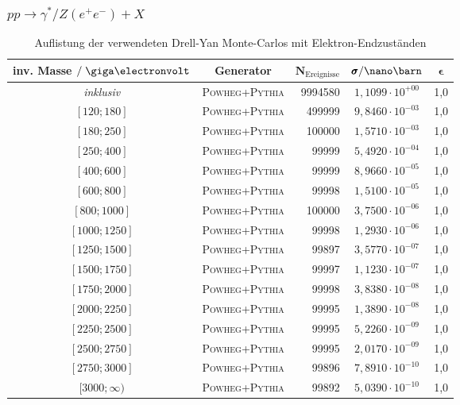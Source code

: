 \subsubsection*{$pp \rightarrow \gamma^*/Z(e^+e^-) + X$}
\begin{table}[h]
    \footnotesize
    \centering
    \begin{tabular}{|c|c|r|c|c|}
        \hline
        \bf{inv. Masse} $/\GeV$ & \bf{Generator} & $\pmb N_\text{Ereignisse}$ &
        $\pmb\sigma / \nano\barn$ & $\pmb\epsilon$ \\
        \hline \hline
        \textit{inklusiv} & \textsc{Powheg+Pythia} & 9994580 & $1,1099\cdot 10^{+00}$ & 1,0 \\
        $[120 ; 180]$     & \textsc{Powheg+Pythia} & 499999  & $9,8460\cdot 10^{-03}$ & 1,0 \\
        $[180 ; 250]$     & \textsc{Powheg+Pythia} & 100000  & $1,5710\cdot 10^{-03}$ & 1,0 \\
        $[250 ; 400]$     & \textsc{Powheg+Pythia} & 99999   & $5,4920\cdot 10^{-04}$ & 1,0 \\
        $[400 ; 600]$     & \textsc{Powheg+Pythia} & 99999   & $8,9660\cdot 10^{-05}$ & 1,0 \\
        $[600 ; 800]$     & \textsc{Powheg+Pythia} & 99998   & $1,5100\cdot 10^{-05}$ & 1,0 \\
        $[800 ; 1000]$    & \textsc{Powheg+Pythia} & 100000  & $3,7500\cdot 10^{-06}$ & 1,0 \\
        $[1000 ; 1250]$   & \textsc{Powheg+Pythia} & 99998   & $1,2930\cdot 10^{-06}$ & 1,0 \\
        $[1250 ; 1500]$   & \textsc{Powheg+Pythia} & 99897   & $3,5770\cdot 10^{-07}$ & 1,0 \\
        $[1500 ; 1750]$   & \textsc{Powheg+Pythia} & 99997   & $1,1230\cdot 10^{-07}$ & 1,0 \\
        $[1750 ; 2000]$   & \textsc{Powheg+Pythia} & 99998   & $3,8380\cdot 10^{-08}$ & 1,0 \\
        $[2000 ; 2250]$   & \textsc{Powheg+Pythia} & 99995   & $1,3890\cdot 10^{-08}$ & 1,0 \\
        $[2250 ; 2500]$   & \textsc{Powheg+Pythia} & 99995   & $5,2260\cdot 10^{-09}$ & 1,0 \\
        $[2500 ; 2750]$   & \textsc{Powheg+Pythia} & 99995   & $2,0170\cdot 10^{-09}$ & 1,0 \\
        $[2750 ; 3000]$   & \textsc{Powheg+Pythia} & 99896   & $7,8910\cdot 10^{-10}$ & 1,0 \\
        $[3000 ; \infty)$ & \textsc{Powheg+Pythia} & 99892   & $5,0390\cdot 10^{-10}$ & 1,0 \\
        \hline
    \end{tabular}
    \caption{Auflistung der verwendeten Drell-Yan Monte-Carlos mit Elektron-Endzuständen} 
\end{table}
\FloatBarrier

